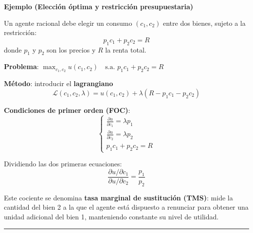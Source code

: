 \begin{f}
	\textbf{Ejemplo (Elección óptima y restricción presupuestaria)}
	
	Un agente racional debe elegir un consumo \((c_1, c_2)\) entre dos bienes, sujeto a la restricción:
	\[
	p_1 c_1 + p_2 c_2 = R
	\]
	donde \(p_1\) y \(p_2\) son los precios y \(R\) la renta total.
	
	\textbf{Problema}:
	\(
	\max_{c_1, c_2} u(c_1, c_2) \quad \text{s.a. } p_1 c_1 + p_2 c_2 = R\)
	
	\textbf{Método}: introducir el \textbf{lagrangiano}
	\[
	\mathcal{L}(c_1, c_2, \lambda) = u(c_1, c_2) + \lambda (R - p_1 c_1 - p_2 c_2)
	\]
	
\noindent
\begin{minipage}[t]{0.49\linewidth}
	\textbf{Condiciones de primer orden (FOC)}:
	\[
	\begin{cases}
		\frac{\partial u}{\partial c_1} = \lambda p_1 \\
		\frac{\partial u}{\partial c_2} = \lambda p_2 \\
		p_1 c_1 + p_2 c_2 = R
	\end{cases}
	\]
\end{minipage}
\hfill
\vrule
\hfill
\begin{minipage}[t]{0.49\linewidth}
	Dividiendo las dos primeras ecuaciones:
	\[
	\frac{\partial u / \partial c_1}{\partial u / \partial c_2}
	=
	\frac{p_1}{p_2}
	\]
\end{minipage}
	
	Este cociente se denomina \textbf{tasa marginal de sustitución (TMS)}: mide la cantidad del bien 2 a la que el agente está dispuesto a renunciar para obtener una unidad adicional del bien 1, manteniendo constante su nivel de utilidad.
	
\end{f}
\hrule

